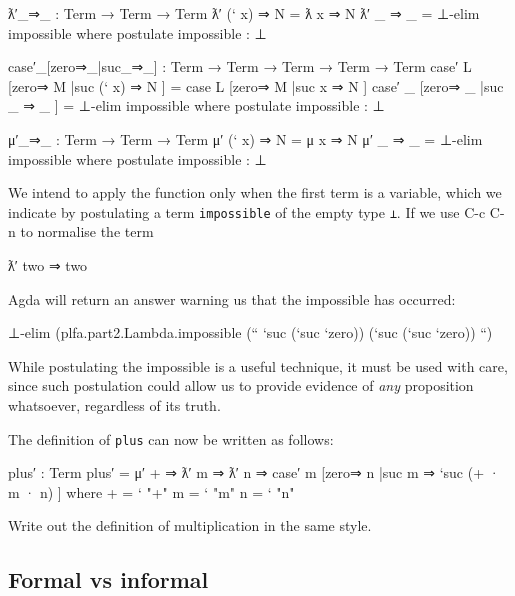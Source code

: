 \begin{fence}
\begin{code}
ƛ′_⇒_ : Term → Term → Term
ƛ′ (` x) ⇒ N  =  ƛ x ⇒ N
ƛ′ _ ⇒ _      =  ⊥-elim impossible
  where postulate impossible : ⊥

case′_[zero⇒_|suc_⇒_] : Term → Term → Term → Term → Term
case′ L [zero⇒ M |suc (` x) ⇒ N ]  =  case L [zero⇒ M |suc x ⇒ N ]
case′ _ [zero⇒ _ |suc _ ⇒ _ ]      =  ⊥-elim impossible
  where postulate impossible : ⊥

μ′_⇒_ : Term → Term → Term
μ′ (` x) ⇒ N  =  μ x ⇒ N
μ′ _ ⇒ _      =  ⊥-elim impossible
  where postulate impossible : ⊥
\end{code}
\end{fence}

We intend to apply the function only when the first term is a variable,
which we indicate by postulating a term \texttt{impossible} of the empty
type \texttt{⊥}. If we use C-c C-n to normalise the term

\begin{myDisplay}
ƛ′ two ⇒ two
\end{myDisplay}

Agda will return an answer warning us that the impossible has occurred:

\begin{myDisplay}
⊥-elim (plfa.part2.Lambda.impossible (`` `suc (`suc `zero)) (`suc (`suc `zero)) ``)
\end{myDisplay}

While postulating the impossible is a useful technique, it must be used
with care, since such postulation could allow us to provide evidence of
\emph{any} proposition whatsoever, regardless of its truth.

The definition of \texttt{plus} can now be written as follows:

\begin{fence}
\begin{code}
plus′ : Term
plus′ = μ′ + ⇒ ƛ′ m ⇒ ƛ′ n ⇒
          case′ m
            [zero⇒ n
            |suc m ⇒ `suc (+ · m · n) ]
  where
  +  =  ` "+"
  m  =  ` "m"
  n  =  ` "n"
\end{code}
\end{fence}

Write out the definition of multiplication in the same style.

\hypertarget{formal-vs-informal}{%
\subsection{Formal vs informal}\label{formal-vs-informal}}

